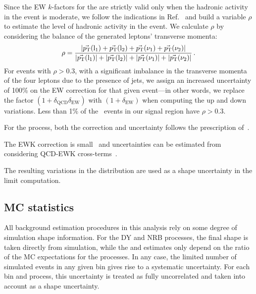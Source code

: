 Since the EW $k$-factors for the \ZZ are strictly valid only when the hadronic
activity in the event is moderate, we follow the
indications in Ref.~\cite{Gieseke:2014gka} and build a variable $\rho$
to estimate the level of hadronic activity in the event.
We calculate $\rho$ by considering the balance of the generated leptons' transverse momenta: 
\begin{equation}
\rho = \frac{\left|\vec{p_{\mathrm{T}}}(\mathrm{l}_1)+\vec{p_{\mathrm{T}}}(\mathrm{l}_2)+\vec{p_{\mathrm{T}}}(\nu_1)+\vec{p_{\mathrm{T}}}(\nu_2)\right|}{\left|\vec{p_{\mathrm{T}}}(\mathrm{l}_1)\right|+\left|\vec{p_{\mathrm{T}}}(\mathrm{l}_2)\right|+\left|\vec{p_{\mathrm{T}}}(\nu_1)\right|+\left|\vec{p_{\mathrm{T}}}(\nu_2)\right|}\,. 
\end{equation} 
For events with $\rho>0.3$, \ie with a significant imbalance in the
transverse momenta of the four leptons due to the presence of jets,
 we assign an increased uncertainty of 100\% on the EW correction for that given
event---in other words, we replace the factor 
$(1+\delta_{\mathrm{QCD}}\delta_{\mathrm{EW}})$ with 
$(1+\delta_{\mathrm{EW}})$ when computing the up and down
variations. Less than 1\% of the \ZZ\ events in our signal region have
$\rho>0.3$.

For the \WZ process, both the correction and uncertainty follows the prescription of~\cite{HZZ2l2v2018}.

The EWK correction is small~\cite{Bierweiler:2013dja,Gieseke:2014gka,Baglio:113005}
and uncertainties can be estimated from considering QCD-EWK cross-terms~\cite{Manohar:2016nzj,Alwall:2014hca,Frixione:2014qaa,Frixione:2015zaa}.

The resulting variations in the \ETm distribution are used as a shape uncertainty in 
the limit computation.

\subsection{MC statistics}

All background estimation procedures in this analysis rely on some degree
of simulation shape information.
For the DY and NRB processes, the final shape is taken directly from simulation, 
while the \WZ and \ZZ estimates only depend on the ratio of the MC expectations for the processes.
In any case, the limited number of simulated events in any given bin gives rise to a systematic uncertainty.
For each bin and process, this uncertainty is treated as fully uncorrelated and taken into account as a shape uncertainty.

